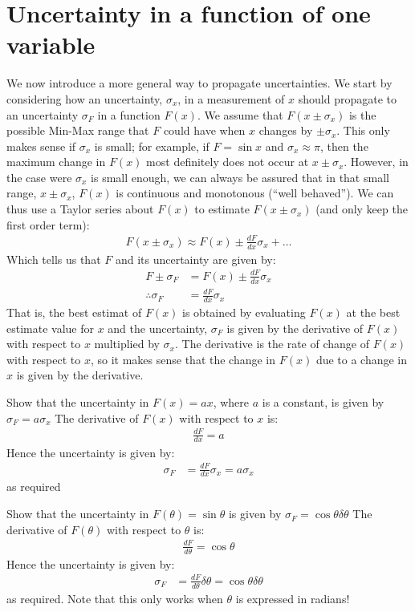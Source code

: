\section{Uncertainty in a function of one variable}
We now introduce a more general way to propagate uncertainties. We start by considering how an uncertainty, $\sigma_{x}$, in a measurement of $x$ should propagate to an uncertainty $\sigma_{F}$ in a function $F(x)$. We assume that $F(x \pm \sigma_{x})$ is the possible Min-Max range that $F$ could have when $x$ changes by $\pm\sigma_{x}$. This only makes sense if $\sigma_{x}$ is small; for example, if $F=\sin x$ and $\sigma_{x} \approx \pi$, then the maximum change in $F(x)$ most definitely does not occur at $x\pm\sigma_{x}$. However, in the case were $\sigma_{x}$ is small enough, we can always be assured that in that small range, $x\pm\sigma_{x}$,  $F(x)$ is continuous and monotonous (``well behaved''). We can thus use a Taylor series about $F(x)$ to estimate $F(x\pm\sigma_{x})$ (and only keep the first order term):
\begin{align}
F(x\pm\sigma_{x})\approx F(x)\pm\frac{dF}{dx}\sigma_{x}+\dots
\end{align}
Which tells us that $F$ and its uncertainty are given by:
\begin{align}
F \pm \sigma_{F} &= F(x) \pm \frac{dF}{dx}\sigma_{x}\nonumber\\
\therefore \sigma_{F}&=\frac{dF}{dx} \sigma_{x}
\end{align}
That is, the best estimat of $F(x)$ is obtained by evaluating $F(x)$ at the best estimate value for $x$ and the uncertainty, $\sigma_{F}$ is given by the derivative of $F(x)$ with respect to $x$ multiplied by $\sigma_{x}$.  The derivative is the rate of change of $F(x)$ with respect to $x$, so it makes sense that the change in $F(x)$ due to a change in $x$ is given by the derivative.

\begin{example}{}{Show that the uncertainty in $F(x)=ax$, where $a$ is a constant, is given by $\sigma_{F}=a \sigma_{x}$}{}
The derivative of $F(x)$ with respect to $x$ is:
\begin{align*}
\frac{dF}{dx}=a
\end{align*}
Hence the uncertainty is given by:
\begin{align*}
\sigma_{F}&=\frac{dF}{dx} \sigma_{x}=a \sigma_{x}
\end{align*}
as required
\end{example}

\begin{example}{}{Show that the uncertainty in $F(\theta)=\sin\theta$ is given by $\sigma_{F}=\cos\theta\delta\theta$}{}
The derivative of $F(\theta)$ with respect to $\theta$ is:
\begin{align*}
\frac{dF}{d\theta}=\cos\theta
\end{align*}
Hence the uncertainty is given by:
\begin{align*}
\sigma_{F}&=\frac{dF}{d\theta} \delta \theta=\cos\theta\delta\theta
\end{align*}
as required. Note that this only works when $\theta$ is expressed in radians!
\end{example}


